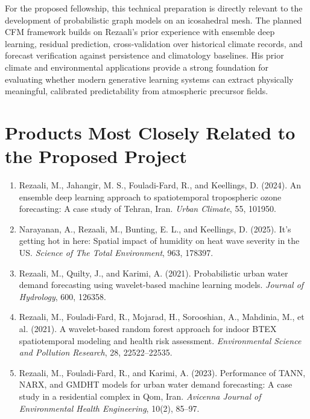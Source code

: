 \documentclass[11pt,letterpaper]{article}
\begin{document}
For the proposed fellowship, this technical preparation is directly relevant to the development of probabilistic graph models on an icosahedral mesh. The planned CFM framework builds on Rezaali's prior experience with ensemble deep learning, residual prediction, cross-validation over historical climate records, and forecast verification against persistence and climatology baselines. His prior climate and environmental applications provide a strong foundation for evaluating whether modern generative learning systems can extract physically meaningful, calibrated predictability from atmospheric precursor fields.

\section*{Products Most Closely Related to the Proposed Project}
\begin{enumerate}
\item Rezaali, M., Jahangir, M. S., Fouladi-Fard, R., and Keellings, D. (2024). An ensemble deep learning approach to spatiotemporal tropospheric ozone forecasting: A case study of Tehran, Iran. \textit{Urban Climate}, 55, 101950.
\item Narayanan, A., Rezaali, M., Bunting, E. L., and Keellings, D. (2025). It's getting hot in here: Spatial impact of humidity on heat wave severity in the US. \textit{Science of The Total Environment}, 963, 178397.
\item Rezaali, M., Quilty, J., and Karimi, A. (2021). Probabilistic urban water demand forecasting using wavelet-based machine learning models. \textit{Journal of Hydrology}, 600, 126358.
\item Rezaali, M., Fouladi-Fard, R., Mojarad, H., Sorooshian, A., Mahdinia, M., et al. (2021). A wavelet-based random forest approach for indoor BTEX spatiotemporal modeling and health risk assessment. \textit{Environmental Science and Pollution Research}, 28, 22522--22535.
\item Rezaali, M., Fouladi-Fard, R., and Karimi, A. (2023). Performance of TANN, NARX, and GMDHT models for urban water demand forecasting: A case study in a residential complex in Qom, Iran. \textit{Avicenna Journal of Environmental Health Engineering}, 10(2), 85--97.
\end{enumerate}
\end{document}

